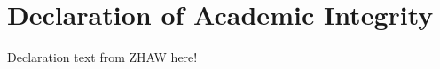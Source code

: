 \documentclass[../eva1_scion.tex]{subfiles}
\begin{document}
    \chapter*{Declaration of Academic Integrity}

    Declaration text from ZHAW here!

\noindent {}
\newpage
\end{document}
